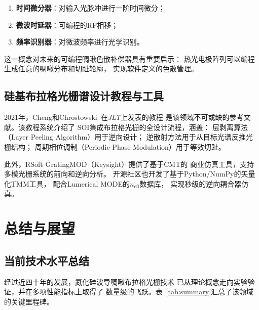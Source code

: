 \documentclass[12pt,a4paper,twoside]{article}
\begin{document}
\begin{enumerate}[leftmargin=*,itemsep=1pt]
\item \textbf{时间微分器}：对输入光脉冲进行一阶时间微分；
\item \textbf{微波时延器}：可编程的RF相移；
\item \textbf{频率识别器}：对微波频率进行光学识别。
\end{enumerate}

这一概念对未来的可编程啁啾色散补偿器具有重要启示：
热光电极阵列可以编程生成任意的啁啾分布和切趾轮廓，
实现软件定义的色散管理。

\subsection{硅基布拉格光栅谱设计教程与工具}

2021年，Cheng和Chrostowski~\cite{cheng2021}在\textit{JLT}上发表的教程
是该领域不可或缺的参考文献。该教程系统介绍了
SOI集成布拉格光栅的全设计流程，涵盖：
层剥离算法（Layer Peeling Algorithm）用于逆向设计；
逆散射方法用于从目标光谱反推光栅结构；
周期相位调制（Periodic Phase Modulation）用于等效切趾。

此外，RSoft GratingMOD（Keysight）提供了基于CMT的
商业仿真工具，支持多模光栅系统的前向和逆向分析。
开源社区也开发了基于Python/NumPy的矢量化TMM工具，
配合Lumerical MODE的$n_{\text{eff}}$数据库，
实现秒级的逆向耦合器仿真。

\newpage

\section{总结与展望}

\subsection{当前技术水平总结}

经过近四十年的发展，氮化硅波导啁啾布拉格光栅技术
已从理论概念走向实验验证，并在多项性能指标上取得了
数量级的飞跃。表~\ref{tab:summary}汇总了该领域的关键里程碑。
\end{document}
